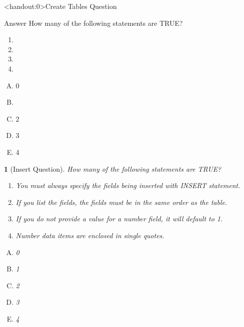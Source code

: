 \documentclass[xcolor=svgnames]{beamer}
\theoremstyle{example}
\newtheorem{example}{\translate{Example}}
\begin{document}
\begin{frame}<handout:0>{Create Tables Question}
\begin{block}
{Answer} How many of the following statements are TRUE?
\begin{enumerate}
\item  {}
\item  {}
\item  {}
\item  {}
\end{enumerate}
\begin{multicols}{5}
\begin{enumerate}[A)]
\item 0 
\item \textbf<5>{\textit<5>{{}}}
\item 2
\item 3
\item 4
\end{enumerate}
\end{multicols}
\end{block}
\end{frame}



\begin{frame}
\begin{example}
[Insert Question] How many of the following statements are TRUE?
\begin{enumerate}
\item You must always specify the fields being inserted with INSERT statement. 
\item If you list the fields, the fields must be in the same order as the table.
\item If you do not provide a value for a number field, it will default to 1.
\item Number data items are enclosed in single quotes.
\end{enumerate}
\begin{multicols}{5}
\begin{enumerate}[A)]
\item 0 
\item 1
\item 2
\item 3
\item 4
\end{enumerate}
\end{multicols}
\end{example}
\end{frame}
\end{document}
